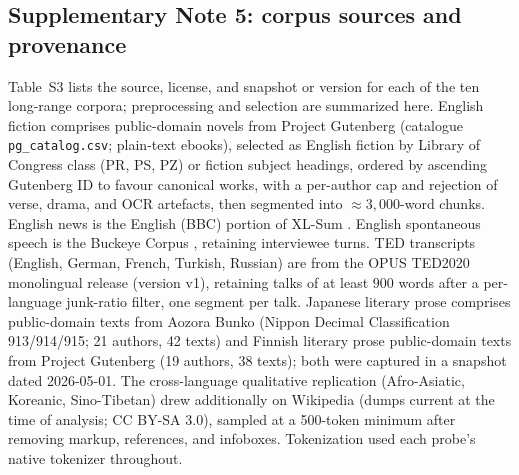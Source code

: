 \documentclass[11pt]{article}
\begin{document}
\subsection*{Supplementary Note 5: corpus sources and provenance}

Table~S3 lists the source, license, and snapshot or version for each of the ten long-range corpora;
preprocessing and selection are summarized here. English fiction comprises public-domain novels from
Project Gutenberg (catalogue \texttt{pg\_catalog.csv}; plain-text ebooks), selected as English fiction
by Library of Congress class (PR, PS, PZ) or fiction subject headings, ordered by ascending Gutenberg
ID to favour canonical works, with a per-author cap and rejection of verse, drama, and OCR artefacts,
then segmented into ${\approx}3{,}000$-word chunks. English news is the English (BBC) portion of XL-Sum
\citep{hasan2021xlsum}. English spontaneous speech is the Buckeye Corpus \citep{pitt2007buckeye,
pitt2005buckeye}, retaining interviewee turns. TED transcripts (English, German, French, Turkish,
Russian) are from the OPUS TED2020 monolingual release \citep{reimers2020making, tiedemann2012parallel}
(version v1), retaining talks of at least $900$ words after a per-language junk-ratio filter, one
segment per talk. Japanese literary prose comprises public-domain texts from Aozora Bunko (Nippon
Decimal Classification 913/914/915; 21 authors, 42 texts) and Finnish literary prose public-domain
texts from Project Gutenberg (19 authors, 38 texts); both were captured in a snapshot dated
2026-05-01. The cross-language qualitative replication (Afro-Asiatic, Koreanic, Sino-Tibetan) drew
additionally on Wikipedia (dumps current at the time of analysis; CC BY-SA 3.0), sampled at a
500-token minimum after removing markup, references, and infoboxes. Tokenization used each probe's
native tokenizer throughout.
\end{document}
